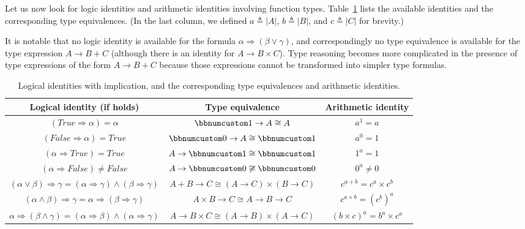 Let us now look for logic identities and arithmetic identities involving
function types. Table~\ref{tab:Logical-identities-with-function-types}
lists the available identities and the corresponding type equivalences.
(In the last column, we defined $a\triangleq\left|A\right|$, $b\triangleq\left|B\right|$,
and $c\triangleq\left|C\right|$ for brevity.) 

It is notable that no logic identity is available for the formula
$\alpha\Rightarrow\left(\beta\vee\gamma\right)$, and correspondingly
no type equivalence is available for the type expression $A\rightarrow B+C$
(although there is an identity for $A\rightarrow B\times C$). Type
reasoning becomes more complicated in the presence of type expressions
of the form $A\rightarrow B+C$ because those expressions cannot be
transformed into simpler type formulas.

\begin{table}
\begin{centering}
\begin{tabular}{|c|c|c|}
\hline 
\textbf{\small{}Logical identity (if holds)} & \textbf{\small{}Type equivalence} & \textbf{\small{}Arithmetic identity}\tabularnewline
\hline 
\hline 
{\small{}$\left(True\Rightarrow\alpha\right)=\alpha$} & {\small{}$\bbnum 1\rightarrow A\cong A$} & {\small{}$a^{1}=a$}\tabularnewline
\hline 
{\small{}$\left(False\Rightarrow\alpha\right)=True$} & {\small{}$\bbnum 0\rightarrow A\cong\bbnum 1$} & {\small{}$a^{0}=1$}\tabularnewline
\hline 
{\small{}$\left(\alpha\Rightarrow True\right)=True$} & {\small{}$A\rightarrow\bbnum 1\cong\bbnum 1$} & {\small{}$1^{a}=1$}\tabularnewline
\hline 
{\small{}$\left(\alpha\Rightarrow False\right)\neq False$} & {\small{}$A\rightarrow\bbnum 0\not\cong\bbnum 0$} & {\small{}$0^{a}\neq0$}\tabularnewline
\hline 
{\small{}$\left(\alpha\vee\beta\right)\Rightarrow\gamma=\left(\alpha\Rightarrow\gamma\right)\wedge\left(\beta\Rightarrow\gamma\right)$} & {\small{}$A+B\rightarrow C\cong\left(A\rightarrow C\right)\times\left(B\rightarrow C\right)$} & {\small{}$c^{a+b}=c^{a}\times c^{b}$}\tabularnewline
\hline 
{\small{}$(\alpha\wedge\beta)\Rightarrow\gamma=\alpha\Rightarrow\left(\beta\Rightarrow\gamma\right)$} & {\small{}$A\times B\rightarrow C\cong A\rightarrow B\rightarrow C$} & {\small{}$c^{a\times b}=(c^{b})^{a}$}\tabularnewline
\hline 
{\small{}$\alpha\Rightarrow\left(\beta\wedge\gamma\right)=\left(\alpha\Rightarrow\beta\right)\wedge\left(\alpha\Rightarrow\gamma\right)$} & {\small{}$A\rightarrow B\times C\cong\left(A\rightarrow B\right)\times\left(A\rightarrow C\right)$} & {\small{}$\left(b\times c\right)^{a}=b^{a}\times c^{a}$}\tabularnewline
\hline 
\end{tabular}
\par\end{centering}
\caption{Logical identities with implication, and the corresponding type equivalences
and arithmetic identities.\label{tab:Logical-identities-with-function-types}}
\end{table}


